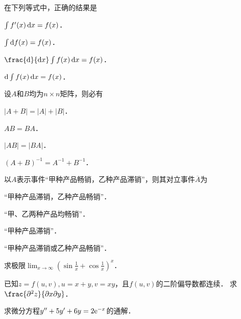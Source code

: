 \documentclass[plain,noanswer,medmath]{../../template/jnuexam}
\begin{document}
\begin{problem}
在下列等式中，正确的结果是 \pickout{}
\begin{abcd}
\item $\int f'(x)\mathop{}\!\mathrm{d} x=f(x)$．
\item $\int \d f(x)=f(x)$．
\item $\frac{\d}{\dx}\int f(x)\dx=f(x)$．
\item $\d\int f(x)\dx=f(x)$．
\end{abcd}
\end{problem}




\begin{problem}
设$A$和$B$均为$n\times n$矩阵，则必有 \pickout{}
\begin{abcd}
\item $|A+B|=|A|+|B|$．
\item $AB=BA$．
\item $|AB|=|BA|$．
\item $(A+B)^{-1}=A^{-1}+B^{-1}$．
\end{abcd}
\end{problem}


\begin{problem}
以$A$表示事件“甲种产品畅销，乙种产品滞销”，则其对立事件$\overline{A}$为 \pickout{}
\begin{abcd}
\item “甲种产品滞销，乙种产品畅销”．
\item “甲、乙两种产品均畅销”．
\item “甲种产品滞销”．
\item “甲种产品滞销或乙种产品畅销”．
\end{abcd}
\end{problem}



\begin{problem}
求极限$\lim_{x\to \infty}\left(\sin\frac{1}{x}+\cos\frac{1}{x}\right)^x$．
\end{problem}


\begin{problem}
已知$z=f(u,v),u=x+y,v=xy$，且$f(u,v)$的二阶偏导数都连续．
求$\frac{\pd^2 z}{\pdx\pd y}$．
\end{problem}


\begin{problem}
求微分方程$y''+5y'+6y=2\mathrm{e}^{-x}$的通解．
\end{problem}


\end{document}
